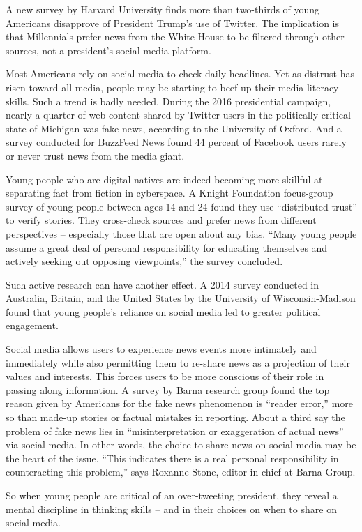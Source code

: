 A new survey by Harvard University finds more than two-thirds of young Americans disapprove of President Trump's use of Twitter. The implication is that Millennials prefer news from the White House to be filtered through other sources, not a president's social media platform.


Most Americans rely on social media to check daily headlines. Yet as distrust has risen toward all media, people may be starting to beef up their media literacy skills. Such a trend is badly needed. During the 2016 presidential campaign, nearly a quarter of web content shared by Twitter users in the politically critical state of Michigan was fake news, according to the University of Oxford. And a survey conducted for BuzzFeed News found 44 percent of Facebook users rarely or never trust news from the media giant.


Young people who are digital natives are indeed becoming more skillful at separating fact from fiction in cyberspace. A Knight Foundation focus-group survey of young people between ages 14 and 24 found they use ``distributed trust'' to verify stories. They cross-check sources and prefer news from different perspectives – especially those that are open about any bias. ``Many young people assume a great deal of personal responsibility for educating themselves and actively seeking out opposing viewpoints,'' the survey concluded.


Such active research can have another effect. A 2014 survey conducted in Australia, Britain, and the United States by the University of Wisconsin-Madison found that young people's reliance on social media led to greater political engagement.


Social media allows users to experience news events more intimately and immediately while also permitting them to re-share news as a projection of their values and interests. This forces users to be more conscious of their role in passing along information. A survey by Barna research group found the top reason given by Americans for the fake news phenomenon is ``reader error,'' more so than made-up stories or factual mistakes in reporting. About a third say the problem of fake news lies in ``misinterpretation or exaggeration of actual news'' via social media. In other words, the choice to share news on social media may be the heart of the issue. ``This indicates there is a real personal responsibility in counteracting this problem,'' says Roxanne Stone, editor in chief at Barna Group.


So when young people are critical of an over-tweeting president, they reveal a mental discipline in thinking skills – and in their choices on when to share on social media.


